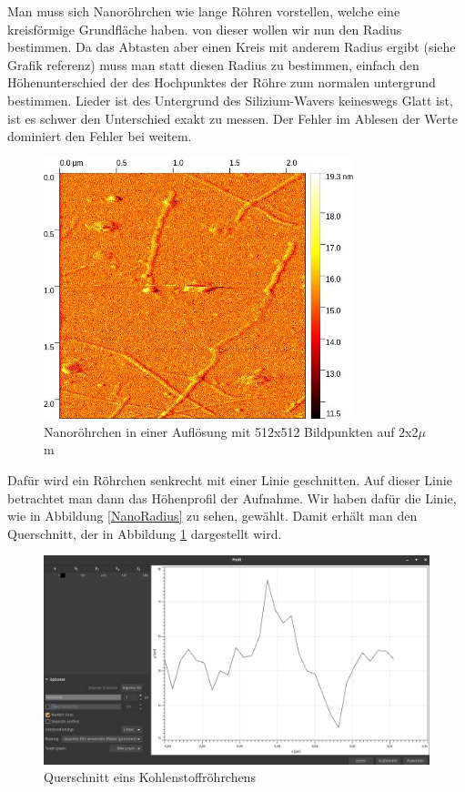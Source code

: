 Man muss sich Nanoröhrchen wie lange Röhren vorstellen, welche eine kreisförmige Grundfläche haben. von dieser wollen wir nun den 
Radius bestimmen. Da das Abtasten aber einen Kreis mit anderem Radius ergibt (siehe Grafik referenz) muss man statt diesen Radius zu bestimmen, einfach 
den Höhenunterschied der des Hochpunktes der Röhre zum normalen untergrund bestimmen. Lieder ist des Untergrund des Silizium-Wavers 
keineswegs Glatt ist, ist es schwer den Unterschied exakt zu messen. Der Fehler im Ablesen der Werte dominiert den Fehler bei weitem. 
\begin{figure}
    \centering
    \includegraphics[width = 9cm]{Bilder/Nanotubes/NanoTube2um.jpg}
    \caption{Nanoröhrchen in einer Auflösung mit 512x512 Bildpunkten auf 2x2$\mu$m}
\end{figure}

Dafür wird ein Röhrchen senkrecht mit einer Linie geschnitten. Auf dieser Linie betrachtet man dann das Höhenprofil der Aufnahme. Wir haben dafür die 
Linie, wie in Abbildung \ref{NanoRadius} zu sehen, gewählt. Damit erhält man den Querschnitt, der in Abbildung \ref{NanoQuerschnitt} 
dargestellt wird.

\begin{figure}
    \centering
    \includegraphics[width = \linewidth]{Bilder/Nanotubes/NanotubesBreiteHoehe.png}
    \caption{Querschnitt eins Kohlenstoffröhrchens}
    \label{NanoQuerschnitt}
\end{figure}

